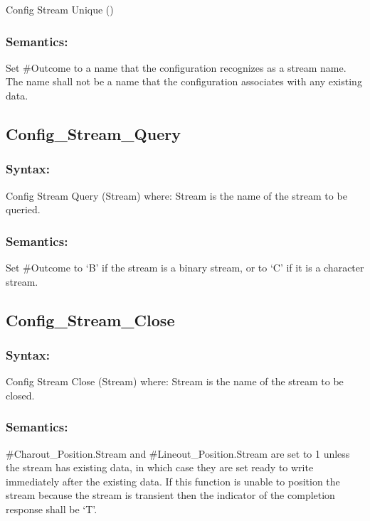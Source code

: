 Config Stream Unique ()

\subsubsection{Semantics:}\label{semantics-30}

Set \#Outcome to a name that the configuration recognizes as a stream
name. The name shall not be a name that the configuration associates
with any existing data.

\subsection{Config\_Stream\_Query}\label{config_stream_query}

\subsubsection{Syntax:}\label{syntax-30}

Config Stream Query (Stream) where: Stream is the name of the stream to
be queried.

\subsubsection{Semantics:}\label{semantics-31}

Set \#Outcome to `B' if the stream is a binary stream, or to `C' if it
is a character stream.

\subsection{Config\_Stream\_Close}\label{config_stream_close}

\subsubsection{Syntax:}\label{syntax-31}

Config Stream Close (Stream) where: Stream is the name of the stream to
be closed.

\subsubsection{Semantics:}\label{semantics-32}

\#Charout\_Position.Stream and \#Lineout\_Position.Stream are set to 1
unless the stream has existing data, in which case they are set ready to
write immediately after the existing data. If this function is unable to
position the stream because the stream is transient then the indicator
of the completion response shall be `T'.

